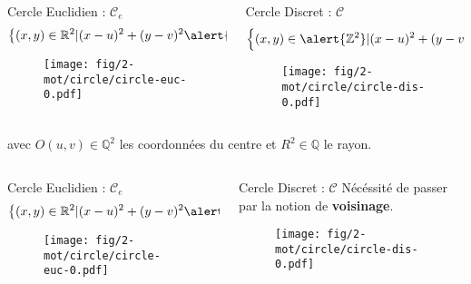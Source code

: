 \begin{frame}
{
  \begin{columns}[t]
    \begin{column}{0.5\linewidth}
      \begin{block}{Cercle Euclidien : $\mathcal{C}_e$}
        $$\left\{ (x,y) \in \mathbb{R}^{2} | (x - u)^2 + (y - v)^2 \alert{=} R^2 \right\}$$
        \begin{figure}[h!]
          \centering
          \texttt{[image: fig/2-mot/circle/circle-euc-0.pdf]}
        \end{figure}
      \end{block}
    
    \end{column}
    \begin{column}{0.5\linewidth}
      \begin{block}{Cercle Discret : $\mathcal{C}$}
        $$\left\{ (x,y) \in \alert{\mathbb{Z}^{2}} | (x - u)^2 + (y - v)^2 \alert{\stackrel{?}{=}} R^2 \right\}$$
        \vspace{-0.24cm}
        \begin{figure}[h!]
          \centering
          \texttt{[image: fig/2-mot/circle/circle-dis-0.pdf]}
        \end{figure}
      \end{block}  
    \end{column}
  \end{columns} 

  \begin{exampleblock}{}
  avec $O(u,v) \in \mathbb{Q}^{2}$ les coordonnées du centre et $R^2 \in \mathbb{Q}$ le rayon.\\
  \end{exampleblock}
}

{
  \begin{columns}[t]
    \begin{column}{0.5\linewidth}
      \begin{block}{Cercle Euclidien : $\mathcal{C}_e$}
        $$\left\{ (x,y) \in \mathbb{R}^{2} | (x - u)^2 + (y - v)^2 \alert{=} R^2 \right\}$$
        \begin{figure}[h!]
          \centering
          \texttt{[image: fig/2-mot/circle/circle-euc-0.pdf]}
        \end{figure}
      \end{block}
    
    \end{column}
    \begin{column}{0.5\linewidth}
      \begin{block}{Cercle Discret : $\mathcal{C}$}
        Nécéssité de passer par la notion de \textbf{voisinage}.
        \vspace{0.24cm}
        \begin{figure}[h!]
          \centering
          \texttt{[image: fig/2-mot/circle/circle-dis-0.pdf]}
        \end{figure}
      \end{block}  
    \end{column}
  \end{columns} 

}
\end{frame}
